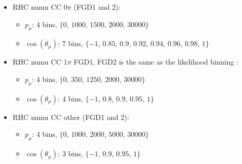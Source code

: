 \begin{itemize}
  
\item \Gls{RHC} \Gls{numu} \Gls{CC} $0\pi$ (\Gls{FGD}1 and 2):
  \begin{itemize}
  \item $p_\mu$: 4 bins, $\{0$, $1000$, $1500$, $2000$, $30000\}$
  \item $\cos(\theta_\mu)$: 7 bins, $\{-1$, $0.85$, $0.9$, $0.92$, $0.94$, $0.96$, $0.98$, $1\}$
  \end{itemize}
\item \Gls{RHC} \Gls{numu} \Gls{CC} $1\pi$ \Gls{FGD}1, \Gls{FGD}2 is
  the same as the likelihood binning :
  \begin{itemize}
  \item $p_\mu$: 4 bins, $\{0$, $350$, $1250$, $2000$, $30000\}$
  \item $\cos(\theta_\mu)$: 4 bins, $\{-1$, $0.8$, $0.9$, $0.95$, $1\}$
  \end{itemize} 
\item \Gls{RHC} \Gls{numu} \Gls{CC} other (\Gls{FGD}1 and 2):
  \begin{itemize}
  \item $p_\mu$: 4 bins, $\{0$, $1000$, $2000$, $5000$, $30000\}$
  \item $\cos(\theta_\mu)$: 3 bins, $\{-1$, $0.9$, $0.95$, $1\}$
  \end{itemize}



\end{itemize}

